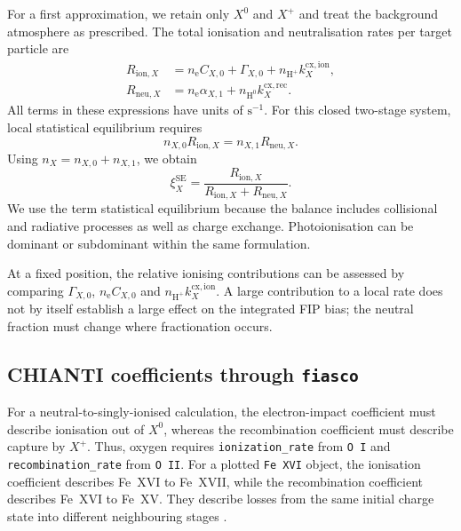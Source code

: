 For a first approximation, we retain only \(X^0\) and \(X^+\) and treat the
background atmosphere as prescribed. The total ionisation and neutralisation
rates per target particle are
\begin{align}
 R_{\mathrm{ion},X}
 &=n_{\mathrm e}C_{X,0}+\Gamma_{X,0}
   +n_{\mathrm{H^+}}k_X^{\mathrm{cx,ion}},
 \label{eq:ion_combined_forward}\\
 R_{\mathrm{neu},X}
 &=n_{\mathrm e}\alpha_{X,1}
   +n_{\mathrm{H^0}}k_X^{\mathrm{cx,rec}}.
 \label{eq:ion_combined_reverse}
\end{align}
All terms in these expressions have units of \(\mathrm{s^{-1}}\).
For this closed two-stage system, local statistical equilibrium requires
\begin{equation}
 n_{X,0}R_{\mathrm{ion},X}
 =n_{X,1}R_{\mathrm{neu},X}.
 \label{eq:ion_balance_two}
\end{equation}
Using \(n_X=n_{X,0}+n_{X,1}\), we obtain
\begin{equation}
 \xi_X^{\mathrm{SE}}
 =\frac{R_{\mathrm{ion},X}}
 {R_{\mathrm{ion},X}+R_{\mathrm{neu},X}}.
 \label{eq:ion_fraction_two}
\end{equation}
We use the term statistical equilibrium because the balance includes
collisional and radiative processes as well as charge exchange.
Photoionisation can be dominant or subdominant within the same formulation.

At a fixed position, the relative ionising contributions can be assessed by
comparing \(\Gamma_{X,0}\), \(n_{\mathrm e}C_{X,0}\) and
\(n_{\mathrm{H^+}}k_X^{\mathrm{cx,ion}}\). A large contribution to a local
rate does not by itself establish a large effect on the integrated FIP bias;
the neutral fraction must change where fractionation occurs.

\subsection{CHIANTI coefficients through \texttt{fiasco}}
\label{subsec:ion_fiasco}

For a neutral-to-singly-ionised calculation, the electron-impact coefficient
must describe ionisation out of \(X^0\), whereas the recombination coefficient
must describe capture by \(X^+\). Thus, oxygen requires
\texttt{ionization\_rate} from \texttt{O I} and
\texttt{recombination\_rate} from \texttt{O II}.
For a plotted \texttt{Fe XVI} object, the ionisation coefficient describes
Fe~XVI to Fe~XVII, while the recombination coefficient describes Fe~XVI to
Fe~XV. They describe losses from the same initial charge state into different
neighbouring stages \cite{fiasco_rates}.

